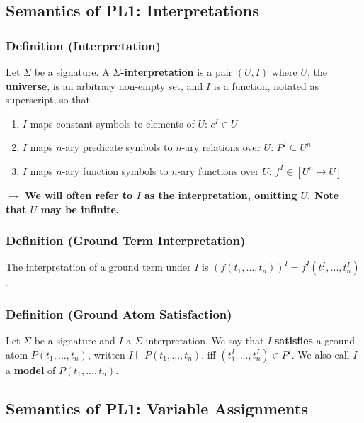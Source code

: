 \documentclass[conference]{styles/acmsiggraph}
\begin{document}
    \subsection{Semantics of PL1: Interpretations}
        \subsubsection{Definition (Interpretation)}
            Let $\Sigma$ be a signature.
            A \textbf{$\Sigma$-interpretation} is a pair $(U,I)$ where $U$, the \textbf{universe}, is an arbitrary non-empty set, and $I$ is a function, notated as superscript, so that
            \begin{enumerate}
                \item $I$ maps constant symbols to elements of $U$: $c^I \in U$
                \item $I$ maps $n$-ary predicate symbols to $n$-ary relations over $U$: $P^I \subseteq U^n$
                \item $I$ maps $n$-ary function symbols to $n$-ary functions over $U$: $f^I \in [U^n \mapsto U]$
            \end{enumerate}
        \textbf{$\rightarrow$ We will often refer to $I$ as the interpretation, omitting $U$. Note that $U$ may be infinite.}
        
        \subsubsection{Definition (Ground Term Interpretation)}
            The interpretation of a ground term under $I$ is $(f(t_1,...,t_n))^I = f^I (t^I_1,...,t^I_n)$.
        
        \subsubsection{Definition (Ground Atom Satisfaction)}
            Let $\Sigma$ be a signature and $I$ a $\Sigma$-interpretation.\newline
            We say that $I$ \textbf{satisfies} a ground atom $P(t_1,...,t_n)$, written $I \vDash P(t_1,...,t_n)$, iff $(t^I_1,...,t^I_n) \in P^I$.\newline
            We also call $I$ a \textbf{model} of $P(t_1,...,t_n)$.
        
    
    \subsection{Semantics of PL1: Variable Assignments}
\end{document}

